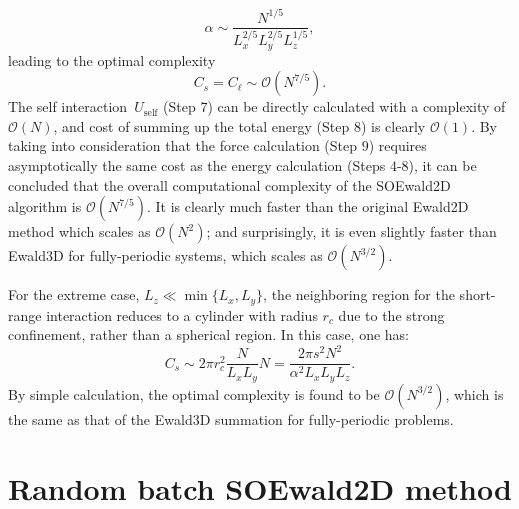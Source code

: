 \begin{equation}
	\alpha \sim \frac{N^{1/5}}{L_x^{2/5}L_y^{2/5}L_z^{1/5}},
\end{equation}
leading to the optimal complexity
\begin{equation}\label{eq::70}
	C_{s} = C_{\ell} \sim \mathcal{O}(N^{7/5}).
\end{equation}
The self interaction~$U_{\text{self}}$ (Step 7) can be directly calculated with a complexity of $\mathcal{O}(N)$, and cost of summing up the total energy (Step 8) is clearly $\mathcal{O}(1)$.
By taking into consideration that the force calculation (Step $9$) requires asymptotically the same cost as the energy calculation (Steps $4$-$8$), it can be concluded that the overall computational complexity of the SOEwald2D algorithm is $\mathcal{O}(N^{7/5})$. 
It is clearly much faster than the original Ewald2D method which scales as $\mathcal{O}(N^{2})$; and surprisingly, it is even slightly faster than Ewald3D for fully-periodic systems, which scales as $\mathcal{O}(N^{3/2})$.

\begin{rmk}\label{rmk::extreme}
	For the extreme case, $L_z \ll \min\{L_x,L_y\}$, the neighboring region for the short-range interaction reduces to a cylinder with radius $r_c$ due to the strong confinement, rather than a spherical region. 
	In this case, one has:
	\begin{equation}
		C_{s}\sim 2\pi r_c^2 \frac{N}{L_x L_y} N=\frac{2\pi s^2N^2}{\alpha^2L_xL_yL_z}.
	\end{equation}
	By simple calculation, the optimal complexity is found to be $\mathcal{O}(N^{3/2})$, which is the same as that of the Ewald3D summation for fully-periodic problems. 
\end{rmk}


\section{Random batch SOEwald2D method} \label{sec:rbm}

